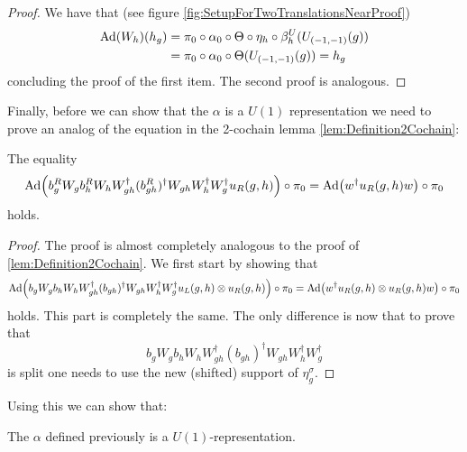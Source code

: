 \documentclass[11pt,a4paper,twoside]{article}
\numberwithin{equation}{section}
\begin{document}
	\begin{proof}
		We have that (see figure \ref{fig:SetupForTwoTranslationsNearProof})
		\begin{align}
			\Ad{W_h}(h_g)&=\pi_0\circ\alpha_0\circ\Theta\circ\eta_h\circ\beta_h^U(U_{(-1,-1)}(g))\\
			&=\pi_0\circ\alpha_0\circ\Theta(U_{(-1,-1)}(g))=h_g
		\end{align}
		concluding the proof of the first item. The second proof is analogous.
	\end{proof}
	Finally, before we can show that the $\alpha$ is a $U(1)$ representation we need to prove an analog of the equation in the 2-cochain lemma \ref{lem:Definition2Cochain}:
	\begin{lemma}\label{lem:translating_u_R_To_The_Right_identity}
		The equality
		\begin{equation}
			\Ad{b_g^R W_g b_h^R W_h W_{gh}^\dagger (b_{gh}^R)^\dagger W_{gh}W_h^\dagger W_g^\dagger u_R(g,h)}\circ\pi_0=\Ad{w^\dagger u_R(g,h) w}\circ\pi_0
		\end{equation}
		holds.
	\end{lemma}
	\begin{proof}
		The proof is almost completely analogous to the proof of \ref{lem:Definition2Cochain}. We first start by showing that
		\begin{equation}
			\Ad{b_g W_g b_h W_h W_{gh}^\dagger (b_{gh})^\dagger W_{gh}W_h^\dagger W_g^\dagger u_L(g,h)\otimes u_R(g,h)}\circ\pi_0=\Ad{w^\dagger u_R(g,h)\otimes u_R(g,h) w}\circ\pi_0
		\end{equation}
		holds. This part is completely the same. The only difference is now that to prove that
		\begin{equation}
			b_g W_g b_h W_h W_{gh}^\dagger (b_{gh})^\dagger W_{gh}W_h^\dagger W_g^\dagger
		\end{equation}
		is split one needs to use the new (shifted) support of $\eta_g^\sigma$.
	\end{proof}
	Using this we can show that:
	\begin{lemma}
		The $\alpha$ defined previously is a $U(1)$-representation.
	\end{lemma}
\end{document}
